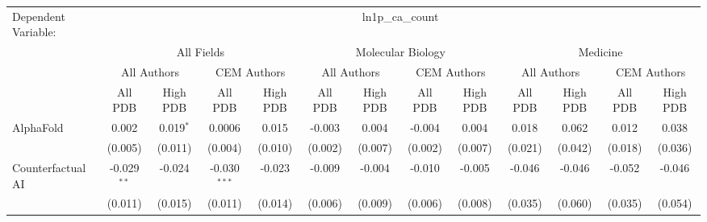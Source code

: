 \begingroup
\centering
\begin{tabular}{lcccccccccccc}
   \tabularnewline \midrule \midrule
   Dependent Variable: & \multicolumn{12}{c}{ln1p\_ca\_count}\\
 & \multicolumn{4}{c}{All Fields} & \multicolumn{4}{c}{Molecular Biology} & \multicolumn{4}{c}{Medicine} \\
\cmidrule(lr){2-5} \cmidrule(lr){6-9} \cmidrule(lr){10-13}
 & \multicolumn{2}{c}{All Authors} & \multicolumn{2}{c}{CEM Authors} & \multicolumn{2}{c}{All Authors} & \multicolumn{2}{c}{CEM Authors} & \multicolumn{2}{c}{All Authors} & \multicolumn{2}{c}{CEM Authors} \\
\cmidrule(lr){2-3} \cmidrule(lr){4-5} \cmidrule(lr){6-7} \cmidrule(lr){8-9} \cmidrule(lr){10-11} \cmidrule(lr){12-13}
 & \multicolumn{1}{c}{All PDB} & \multicolumn{1}{c}{High PDB} & \multicolumn{1}{c}{All PDB} & \multicolumn{1}{c}{High PDB} & \multicolumn{1}{c}{All PDB} & \multicolumn{1}{c}{High PDB} & \multicolumn{1}{c}{All PDB} & \multicolumn{1}{c}{High PDB} & \multicolumn{1}{c}{All PDB} & \multicolumn{1}{c}{High PDB} & \multicolumn{1}{c}{All PDB} & \multicolumn{1}{c}{High PDB} \\
\cmidrule(lr){2-2} \cmidrule(lr){3-3} \cmidrule(lr){4-4} \cmidrule(lr){5-5} \cmidrule(lr){6-6} \cmidrule(lr){7-7} \cmidrule(lr){8-8} \cmidrule(lr){9-9} \cmidrule(lr){10-10} \cmidrule(lr){11-11} \cmidrule(lr){12-12} \cmidrule(lr){13-13}
   AlphaFold                                                  & 0.002          & 0.019$^{*}$   & 0.0006         & 0.015        & -0.003         & 0.004        & -0.004        & 0.004        & 0.018         & 0.062         & 0.012         & 0.038\\   
                                                              & (0.005)        & (0.011)       & (0.004)        & (0.010)      & (0.002)        & (0.007)      & (0.002)       & (0.007)      & (0.021)       & (0.042)       & (0.018)       & (0.036)\\   
   Counterfactual AI                                          & -0.029$^{**}$  & -0.024        & -0.030$^{***}$ & -0.023       & -0.009         & -0.004       & -0.010        & -0.005       & -0.046        & -0.046        & -0.052        & -0.046\\   
                                                              & (0.011)        & (0.015)       & (0.011)        & (0.014)      & (0.006)        & (0.009)      & (0.006)       & (0.008)      & (0.035)       & (0.060)       & (0.035)       & (0.054)\\   

\end{tabular}
